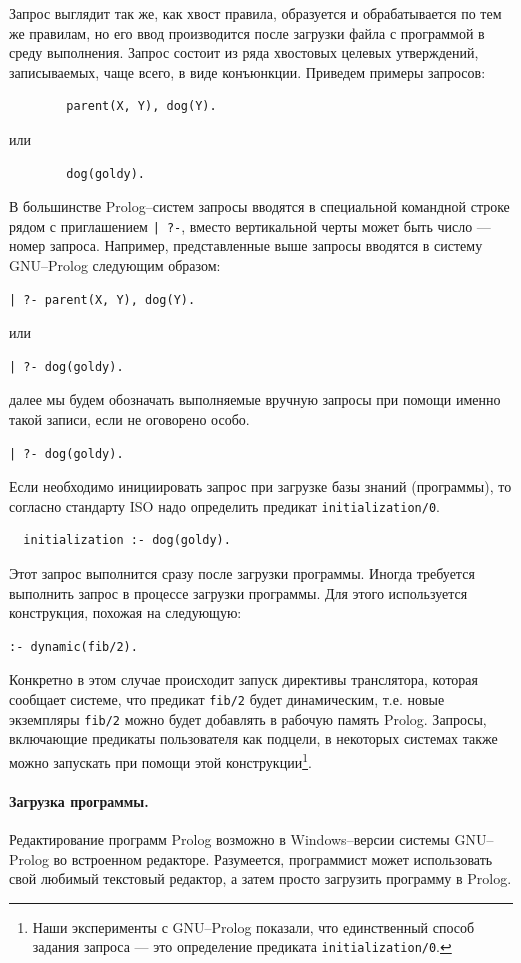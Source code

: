\documentclass[12pt, openany, twoside]{book} %
\begin{document}
Запрос выглядит так же, как хвост правила, образуется и обрабатывается по тем же правилам, но его ввод производится после загрузки файла с программой в среду выполнения. Запрос состоит из ряда хвостовых целевых утверждений, записываемых, чаще всего, в виде конъюнкции. Приведем примеры запросов:
{\tt\begin{verbatim}
        parent(X, Y), dog(Y).
\end{verbatim}}
\noindent или
{\tt\begin{verbatim}
        dog(goldy).
\end{verbatim}}
В большинстве Prolog--систем запросы вводятся в специальной командной строке рядом с приглашением \texttt{| ?-}, вместо вертикальной черты может быть число --- номер запроса. Например, представленные выше запросы вводятся в систему GNU--Prolog следующим образом:
{\tt\begin{verbatim}
| ?- parent(X, Y), dog(Y).
\end{verbatim}}
\noindent или
{\tt\begin{verbatim}
| ?- dog(goldy).
\end{verbatim}}
далее мы будем обозначать выполняемые вручную запросы при помощи именно такой записи, если не оговорено особо.
{\tt\begin{verbatim}
| ?- dog(goldy).
\end{verbatim}}

Если необходимо инициировать запрос при загрузке базы знаний (программы), то согласно стандарту ISO надо определить предикат \texttt{initialization/0}.
{\tt\begin{verbatim}
  initialization :- dog(goldy).
\end{verbatim}}
Этот запрос выполнится сразу после загрузки программы. Иногда требуется выполнить запрос в процессе загрузки программы. Для этого используется конструкция, похожая на следующую:
{\tt\begin{verbatim}
:- dynamic(fib/2).
\end{verbatim}}
Конкретно в этом случае происходит запуск директивы транслятора, которая сообщает системе, что предикат \texttt{fib/2} будет динамическим, т.е. новые экземпляры \texttt{fib/2} можно будет добавлять в рабочую память Prolog. Запросы, включающие предикаты пользователя как подцели, в некоторых системах также можно запускать при помощи этой конструкции\footnote{Наши эксперименты с GNU--Prolog показали, что единственный способ задания запроса --- это определение предиката \texttt{initialization/0}.}.

\paragraph{Загрузка программы.} Редактирование программ Prolog возможно в Windows--версии системы GNU--Prolog во встроенном редакторе. Разумеется, программист может использовать свой любимый текстовый редактор, а затем просто загрузить программу в Prolog.
\end{document}
